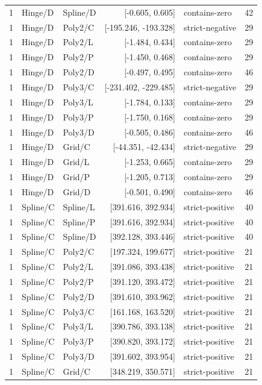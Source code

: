\begin{longtable}{lllrlr}
1 & Hinge/D & Spline/D & [-0.605, 0.605] & contains-zero & 42 \\
1 & Hinge/D & Poly2/C & [-195.246, -193.328] & strict-negative & 29 \\
1 & Hinge/D & Poly2/L & [-1.484, 0.434] & contains-zero & 29 \\
1 & Hinge/D & Poly2/P & [-1.450, 0.468] & contains-zero & 29 \\
1 & Hinge/D & Poly2/D & [-0.497, 0.495] & contains-zero & 46 \\
1 & Hinge/D & Poly3/C & [-231.402, -229.485] & strict-negative & 29 \\
1 & Hinge/D & Poly3/L & [-1.784, 0.133] & contains-zero & 29 \\
1 & Hinge/D & Poly3/P & [-1.750, 0.168] & contains-zero & 29 \\
1 & Hinge/D & Poly3/D & [-0.505, 0.486] & contains-zero & 46 \\
1 & Hinge/D & Grid/C & [-44.351, -42.434] & strict-negative & 29 \\
1 & Hinge/D & Grid/L & [-1.253, 0.665] & contains-zero & 29 \\
1 & Hinge/D & Grid/P & [-1.205, 0.713] & contains-zero & 29 \\
1 & Hinge/D & Grid/D & [-0.501, 0.490] & contains-zero & 46 \\
1 & Spline/C & Spline/L & [391.616, 392.934] & strict-positive & 40 \\
1 & Spline/C & Spline/P & [391.616, 392.934] & strict-positive & 40 \\
1 & Spline/C & Spline/D & [392.128, 393.446] & strict-positive & 40 \\
1 & Spline/C & Poly2/C & [197.324, 199.677] & strict-positive & 21 \\
1 & Spline/C & Poly2/L & [391.086, 393.438] & strict-positive & 21 \\
1 & Spline/C & Poly2/P & [391.120, 393.472] & strict-positive & 21 \\
1 & Spline/C & Poly2/D & [391.610, 393.962] & strict-positive & 21 \\
1 & Spline/C & Poly3/C & [161.168, 163.520] & strict-positive & 21 \\
1 & Spline/C & Poly3/L & [390.786, 393.138] & strict-positive & 21 \\
1 & Spline/C & Poly3/P & [390.820, 393.172] & strict-positive & 21 \\
1 & Spline/C & Poly3/D & [391.602, 393.954] & strict-positive & 21 \\
1 & Spline/C & Grid/C & [348.219, 350.571] & strict-positive & 21 \\

\end{longtable}

